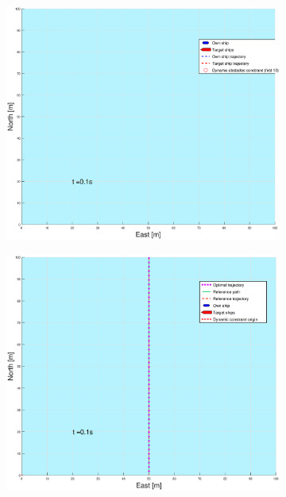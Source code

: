 \begin{figure}[!b] %
    \begin{subfigure}[b]{0.49\textwidth}
        \centering
        \includegraphics[width=\textwidth]{Images/Figures/enkel_GW/_Simple_1fig1_time=0}
    \end{subfigure}
    \hfill
    \begin{subfigure}[b]{0.499\textwidth}
        \centering
        \includegraphics[width=\textwidth]{Images/Figures/enkel_GW/_Simple_1fig999_time=0}

\end{subfigure}
\end{figure}
